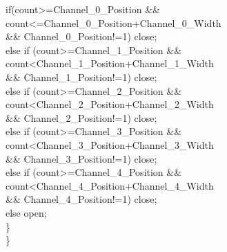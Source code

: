 \tabto*{1cm} if(count>=Channel\_0\_Position \&\& count<=Channel\_0\_Position+Channel\_0\_Width \\ \tabto*{1cm} \&\& Channel\_0\_Position!=1) close;\\
\tabto*{1cm} else if (count>=Channel\_1\_Position \&\& count<Channel\_1\_Position+Channel\_1\_Width \\ \tabto*{1cm} \&\& Channel\_1\_Position!=1) close;\\
\tabto*{1cm} else if (count>=Channel\_2\_Position \&\& count<Channel\_2\_Position+Channel\_2\_Width \\ \tabto*{1cm} \&\& Channel\_2\_Position!=1) close;\\
\tabto*{1cm} else if (count>=Channel\_3\_Position \&\& count<Channel\_3\_Position+Channel\_3\_Width \\ \tabto*{1cm} \&\& Channel\_3\_Position!=1) close;\\
\tabto*{1cm} else if (count>=Channel\_4\_Position \&\& count<Channel\_4\_Position+Channel\_4\_Width \\ \tabto*{1cm} \&\&  Channel\_4\_Position!=1) close;\\
\tabto*{1cm} else open;\\
\tabto*{.5cm}\}\\
\}

\newpage

